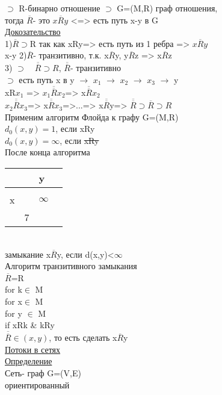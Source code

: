 \documentclass{article}
\begin{document}
$\supset$ R-бинарно отношение $\supset$ G=(M,R) граф отношения,\\
тогда $\overline{R}$- это $x\overline{R}y$ <=> есть путь x-y в G\\
\underline{Докозательство}\\
1)$\overline{R} \supset$R так как xRy=> есть путь из 1 ребра => $x\overline{R}y$\\
x-y 2)$\overline{R}$- транзитивно, т.к. x$\overline{R}$y, y$\overline{R}$z => x$\overline{R}$z\\
3) $\supset \quad \overline{\overline{R}}\supset R$, $\overline{\overline{R}}$- транзитивно\\
$\supset$ есть путь x в y $\rightarrow$ $x_1$ $\rightarrow$ $x_2$ $\rightarrow$ $x_3$ $\rightarrow$ y\\
xR$x_1$ => $x_1 \overline{\overline{R}} x_2$=> x$\overline{\overline{R}} x_2$\\
$x_2 \overline{\overline{R}} x_3$=> x$\overline{\overline{R}} x_3$=>...=> x$\overline{\overline{R}}$y=>  $\overline{\overline{R}} \supset \overline{R} \supset R$\\
Применим алгоритм Флойда к графу G=(M,R)\\
$d_0 (x,y)=1$, если xRy\\
$d_0 (x,y)=\infty$, если \sout{xRy}\\
После конца алгоритма\\
\begin{tabular}{l|l l l}
 & &y&\\
\hline
&  &&\\
x&  &$\infty$ &  \\
&7  & &\\
\end{tabular}\\
замыкание x$\overline{R}$y, если d(x,y)<$\infty$\\
Алгоритм транзитивного замыкания\\
$\overline{R}$=R\\
for k$\in$ M\\
for x$\in$ M\\
for y $\in$ M\\
if xRk \& kRy\\
$\overline{\overline{R}} \in (x,y)$, то есть сделать x$\overline{R}$y\\
\underline{Потоки в сетях}\\
\underline{Определение}\\
Сеть- граф G=(V,E)\\ ориентированный\\
\end{document}
